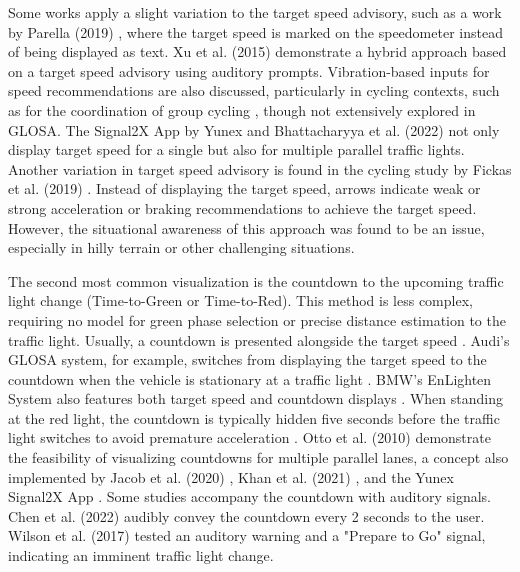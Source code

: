 Some works apply a slight variation to the target speed advisory, such as a work by Parella (2019) \cite{marias_parella_design_2019}, where the target speed is marked on the speedometer instead of being displayed as text. Xu et al. (2015) \cite{xu_bb_2015} demonstrate a hybrid approach based on a target speed advisory using auditory prompts. Vibration-based inputs for speed recommendations are also discussed, particularly in cycling contexts, such as for the coordination of group cycling \cite{cespedes_group_2019}, though not extensively explored in GLOSA. The Signal2X App by Yunex \cite{yunex_traffic_v2x-kommunikation_2023} and Bhattacharyya et al. (2022) \cite{bhattacharyya_assessing_2022} not only display target speed for a single but also for multiple parallel traffic lights. Another variation in target speed advisory is found in the cycling study by Fickas et al. (2019) \cite{fickas_fast_2019}. Instead of displaying the target speed, arrows indicate weak or strong acceleration or braking recommendations to achieve the target speed. However, the situational awareness of this approach was found to be an issue, especially in hilly terrain or other challenging situations.

The second most common visualization is the countdown to the upcoming traffic light change (Time-to-Green or Time-to-Red). This method is less complex, requiring no model for green phase selection or precise distance estimation to the traffic light. Usually, a countdown is presented alongside the target speed \cite{koukoumidis_signalguru_2011, koukoumidis_leveraging_2012}. Audi's GLOSA system, for example, switches from displaying the target speed to the countdown when the vehicle is stationary at a traffic light \cite{zweck_traffic_2013}. BMW's EnLighten System also features both target speed and countdown displays \cite{sokolov_effects_2018}. When standing at the red light, the countdown is typically hidden five seconds before the traffic light switches to avoid premature acceleration \cite{stahlmann_exploring_2018, sokolov_effects_2018}. Otto et al. (2010) \cite{otto_operating_2010} demonstrate the feasibility of visualizing countdowns for multiple parallel lanes, a concept also implemented by Jacob et al. (2020) \cite{jacob_ivs-kom_2020}, Khan et al. (2021) \cite{khan_eco-drive_2021}, and the Yunex Signal2X App \cite{yunex_traffic_v2x-kommunikation_2023}. Some studies accompany the countdown with auditory signals. Chen et al. (2022) \cite{chen_developing_2022} audibly convey the countdown every 2 seconds to the user. Wilson et al. (2017) \cite{wilson_driver_2017} tested an auditory warning and a "Prepare to Go" signal, indicating an imminent traffic light change.


